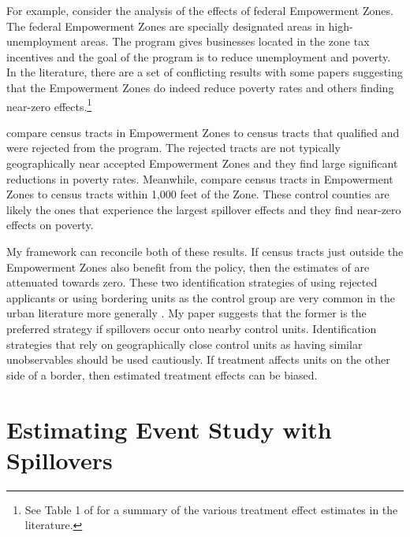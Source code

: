 \documentclass[11pt]{article}
\begin{document}
For example, consider the analysis of the effects of federal Empowerment Zones. The federal Empowerment Zones are specially designated areas in high-unemployment areas. The program gives businesses located in the zone tax incentives and the goal of the program is to reduce unemployment and poverty. In the literature, there are a set of conflicting results with some papers suggesting that the Empowerment Zones do indeed reduce poverty rates and others finding near-zero effects.\footnote{See Table 1 of \citet{Neumark_Young_2019} for a summary of the various treatment effect estimates in the literature.} 

\citet{Busso_Gregory_Kline_2013} compare census tracts in Empowerment Zones to census tracts that qualified and were rejected from the program. The rejected tracts are not typically geographically near accepted Empowerment Zones and they find large significant reductions in poverty rates. Meanwhile, \citet{Neumark_Kolko_2010} compare census tracts in Empowerment Zones to census tracts within 1,000 feet of the Zone. These control counties are likely the ones that experience the largest spillover effects and they find near-zero effects on poverty. 

My framework can reconcile both of these results. If census tracts just outside the Empowerment Zones also benefit from the policy, then the estimates of \citet{Neumark_Kolko_2010} are attenuated towards zero. These two identification strategies of using rejected applicants or using bordering units as the control group are very common in the urban literature more generally \citep{Baum-Snow_Ferreira_2015}. My paper suggests that the former is the preferred strategy if spillovers occur onto nearby control units. Identification strategies that rely on geographically close control units as having similar unobservables should be used cautiously. If treatment affects units on the other side of a border, then estimated treatment effects can be biased.



\section{Estimating Event Study with Spillovers}
\label{sec:event_study}
\end{document}
